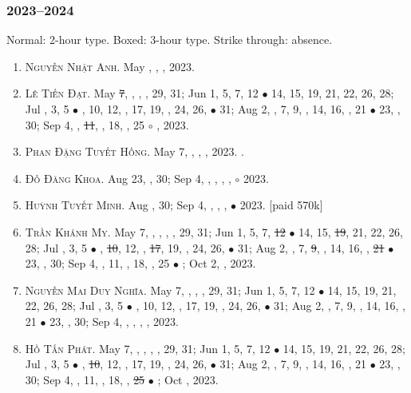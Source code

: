 \documentclass{article}
\begin{document}
\subsubsection{2023--2024}
Normal: 2-hour type. Boxed: 3-hour type. Strike through: absence.
\begin{enumerate}
	\item \textsc{Nguyễn Nhật Anh.} {\sf[In]} May , , , 2023. {\sf[Out]}
	\item \textsc{Lê Tiến Đạt.} May \st{7}, , , , 29, 31; Jun 1, 5, 7, 12 $\bullet$ 14, 15, 19, 21, 22, 26, 28; Jul , 3, 5 $\bullet$ , 10, 12, , 17, 19, , 24, 26,  $\bullet$ 31; Aug 2, , 7, 9, , 14, 16, , 21 $\bullet$ 23, , 30; Sep 4, , \st{11}, , 18, , 25 $\circ$ , 2023. {\sf[Out]}
	\item \textsc{Phan Đặng Tuyết Hồng.} May 7, , , , 2023. {}. {\sf[Out]}
	\item \textsc{Đỗ Đăng Khoa.} {\sf[In]} Aug 23, , 30; Sep 4, , , , , $\circ$ 2023.
	\item \textsc{Huỳnh Tuyết Minh.} {\sf[In]} Aug , 30; Sep 4, , , ,  $\bullet$ 2023. [paid 570k]
	\item \textsc{Trần Khánh My.} May 7, , , , , 29, 31; Jun 1, 5, 7, \st{12} $\bullet$ 14, 15, \st{19}, 21, 22, 26, 28; Jul , 3, 5 $\bullet$ , \st{10}, 12, , \st{17}, 19, , 24, 26,  $\bullet$ 31; Aug 2, , 7, \st{9}, , 14, 16, , \st{21} $\bullet$ 23, , 30; Sep 4, , 11, , 18, , 25 $\bullet$ ; Oct 2, , 2023.
	\item \textsc{Nguyễn Mai Duy Nghĩa.} May 7, , , , 29, 31; Jun 1, 5, 7, 12 $\bullet$ 14, 15, 19, 21, 22, 26, 28; Jul , 3, 5 $\bullet$ , 10, 12, , 17, 19, , 24, 26,  $\bullet$ 31; Aug 2, , 7, 9, , 14, 16, , 21 $\bullet$ 23, , 30; Sep 4, , , , , 2023.
	\item \textsc{Hồ Tấn Phát.} May 7, , , , , 29, 31; Jun 1, 5, 7, 12 $\bullet$ 14, 15, 19, 21, 22, 26, 28; Jul , 3, 5 $\bullet$ , \st{10}, 12, , 17, 19, , 24, 26,  $\bullet$ 31; Aug 2, , 7, 9, , 14, 16, , 21 $\bullet$ 23, , 30; Sep 4, , 11, , 18, , \st{25} $\bullet$ ; Oct , 2023.

\end{enumerate}
\end{document}
